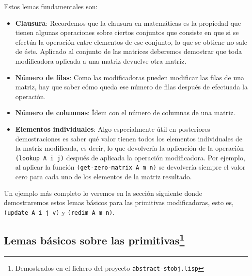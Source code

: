 \documentclass[a4paper,10pt]{article}
\begin{document}
\par \vspace{10pt}

Estos lemas fundamentales son: 

\par \vspace{10pt}

\begin{itemize}
	\item \textbf{Clausura}: Recordemos que la clausura en matemáticas es la propiedad que tienen algunas operaciones sobre ciertos conjuntos que consiste en que si se efectúa la operación entre elementos de ese conjunto, lo que se obtiene no sale de éste. Aplicado al conjunto de las matrices deberemos demostrar que toda modificadora aplicada a una matriz devuelve otra matriz.
	\item \textbf{Número de filas}: Como las modificadoras pueden modificar las filas de una matriz, hay que saber cómo queda ese número de filas después de efectuada la operación.
	\item \textbf{Número de columnas}: Ídem con el número de columnas de una matriz.
	\item \textbf{Elementos individuales}: Algo especialmente útil en posteriores demostraciones es saber qué valor tienen todos los elementos individuales de la matriz modificada, es decir, lo que devolvería la aplicación de la operación \texttt{(lookup A i j)} después de aplicada la operación modificadora. Por ejemplo, al aplicar la función \texttt{(get-zero-matrix A m n)} se devolvería siempre el valor cero para cada uno de los elementos de la matriz resultado.
\end{itemize}

\par \vspace{10pt}

Un ejemplo más completo lo veremos en la sección siguiente donde demostraremos estos lemas básicos para las primitivas modificadoras, esto es, \texttt{(update A i j v)} y \texttt{(redim A m n)}.

\vspace{12pt}
\subsection[Lemas básicos sobre las primitivas]{Lemas básicos sobre las primitivas\footnote{Demostrados en el fichero del proyecto \texttt{abstract-stobj.lisp}}}
\vspace{10pt}
\end{document}
